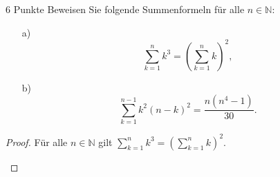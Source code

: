 \documentclass{problemset}
\author{Michael van Straten}
\begin{document}
\maketitle

\begin{problem}[Summenformeln]{6 Punkte}
Beweisen Sie folgende Summenformeln für alle $n \in \mathbb{N}$:
\begin{enumerate}
    \item[a)]
          \[
              \sum_{k = 1}^{n} k^3 = \left(\sum_{k = 1}^{n}k\right)^2,
          \]
    \item[b)]
          \[
              \sum_{k = 1}^{n-1} k^2(n-k)^2 = \frac{n(n^4-1)}{30}.
          \]
\end{enumerate}
\begin{proof}
    Für alle $n \in \mathbb{N}$ gilt $\sum_{k = 1}^{n} k^3 = \left(\sum_{k = 1}^{n}k\right)^2$.
    \begin{enumerate}


\end{enumerate}
\end{proof}
\end{problem}
\end{document}
